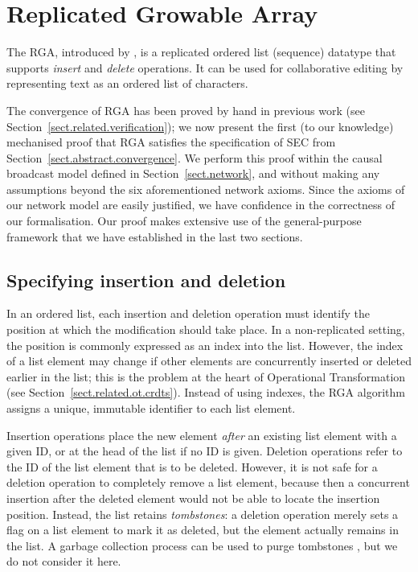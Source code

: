 \section{Replicated Growable Array}
\label{sect.rga}

The RGA, introduced by \citet{Roh:2011dw}, is a replicated ordered list (sequence) datatype that supports \emph{insert} and \emph{delete} operations.
It can be used for collaborative editing by representing text as an ordered list of characters.

The convergence of RGA has been proved by hand in previous work (see Section~\ref{sect.related.verification}); we now present the first (to our knowledge) mechanised proof that RGA satisfies the specification of SEC from Section~\ref{sect.abstract.convergence}.
We perform this proof within the causal broadcast model defined in Section~\ref{sect.network}, and without making any assumptions beyond the six aforementioned network axioms.
Since the axioms of our network model are easily justified, we have confidence in the correctness of our formalisation.
Our proof makes extensive use of the general-purpose framework that we have established in the last two sections.

\subsection{Specifying insertion and deletion}\label{sect.rga.spec}

In an ordered list, each insertion and deletion operation must identify the position at which the modification should take place.
In a non-replicated setting, the position is commonly expressed as an index into the list.
However, the index of a list element may change if other elements are concurrently inserted or deleted earlier in the list; this is the problem at the heart of Operational Transformation (see Section~\ref{sect.related.ot.crdts}).
Instead of using indexes, the RGA algorithm assigns a unique, immutable identifier to each list element.

Insertion operations place the new element \emph{after} an existing list element with a given ID, or at the head of the list if no ID is given.
Deletion operations refer to the ID of the list element that is to be deleted.
However, it is not safe for a deletion operation to completely remove a list element, because then a concurrent insertion after the deleted element would not be able to locate the insertion position.
Instead, the list retains \emph{tombstones}: a deletion operation merely sets a flag on a list element to mark it as deleted, but the element actually remains in the list.
A garbage collection process can be used to purge tombstones \cite{Roh:2011dw}, but we do not consider it here.

